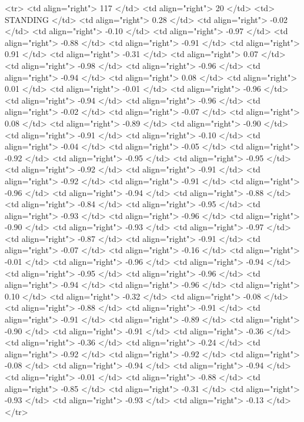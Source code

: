   <tr> <td align="right"> 117 </td> <td align="right">  20 </td> <td> STANDING </td> <td align="right"> 0.28 </td> <td align="right"> -0.02 </td> <td align="right"> -0.10 </td> <td align="right"> -0.97 </td> <td align="right"> -0.88 </td> <td align="right"> -0.91 </td> <td align="right"> 0.91 </td> <td align="right"> -0.31 </td> <td align="right"> 0.07 </td> <td align="right"> -0.98 </td> <td align="right"> -0.96 </td> <td align="right"> -0.94 </td> <td align="right"> 0.08 </td> <td align="right"> 0.01 </td> <td align="right"> -0.01 </td> <td align="right"> -0.96 </td> <td align="right"> -0.94 </td> <td align="right"> -0.96 </td> <td align="right"> -0.02 </td> <td align="right"> -0.07 </td> <td align="right"> 0.08 </td> <td align="right"> -0.89 </td> <td align="right"> -0.90 </td> <td align="right"> -0.91 </td> <td align="right"> -0.10 </td> <td align="right"> -0.04 </td> <td align="right"> -0.05 </td> <td align="right"> -0.92 </td> <td align="right"> -0.95 </td> <td align="right"> -0.95 </td> <td align="right"> -0.92 </td> <td align="right"> -0.91 </td> <td align="right"> -0.92 </td> <td align="right"> -0.91 </td> <td align="right"> -0.96 </td> <td align="right"> -0.94 </td> <td align="right"> -0.88 </td> <td align="right"> -0.84 </td> <td align="right"> -0.95 </td> <td align="right"> -0.93 </td> <td align="right"> -0.96 </td> <td align="right"> -0.90 </td> <td align="right"> -0.93 </td> <td align="right"> -0.97 </td> <td align="right"> -0.87 </td> <td align="right"> -0.91 </td> <td align="right"> -0.07 </td> <td align="right"> -0.16 </td> <td align="right"> -0.01 </td> <td align="right"> -0.96 </td> <td align="right"> -0.94 </td> <td align="right"> -0.95 </td> <td align="right"> -0.96 </td> <td align="right"> -0.94 </td> <td align="right"> -0.96 </td> <td align="right"> 0.10 </td> <td align="right"> -0.32 </td> <td align="right"> -0.08 </td> <td align="right"> -0.88 </td> <td align="right"> -0.91 </td> <td align="right"> -0.91 </td> <td align="right"> -0.89 </td> <td align="right"> -0.90 </td> <td align="right"> -0.91 </td> <td align="right"> -0.36 </td> <td align="right"> -0.36 </td> <td align="right"> -0.24 </td> <td align="right"> -0.92 </td> <td align="right"> -0.92 </td> <td align="right"> -0.08 </td> <td align="right"> -0.94 </td> <td align="right"> -0.94 </td> <td align="right"> -0.01 </td> <td align="right"> -0.88 </td> <td align="right"> -0.85 </td> <td align="right"> -0.31 </td> <td align="right"> -0.93 </td> <td align="right"> -0.93 </td> <td align="right"> -0.13 </td> </tr>
